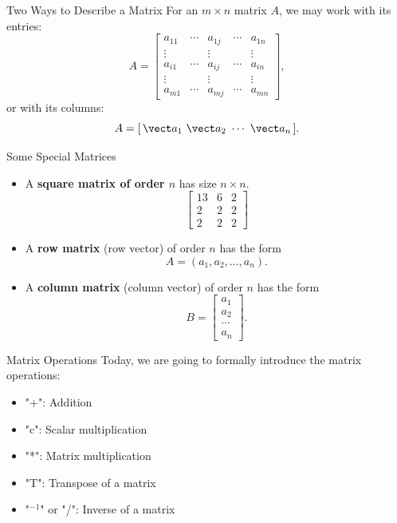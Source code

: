 \begin{frame}{Two Ways to Describe a Matrix}
For an $m\times n$ matrix $A$, we may work with its entries:
\[
A=\begin{bmatrix}
a_{11}&\cdots&a_{1j}&\cdots&a_{1n}\\
\vdots&&\vdots&&\vdots\\
a_{i1}&\cdots&a_{ij}&\cdots&a_{in}\\
\vdots&&\vdots&&\vdots\\
a_{m1}&\cdots&a_{mj}&\cdots&a_{mn}
\end{bmatrix},
\]
or with its columns:
\[
A=[\,\vect a_1\ \vect a_2\ \cdots\ \vect a_n\,].
\]
\end{frame}

\begin{frame}{Some Special Matrices}
\begin{itemize}
  \item A \textbf{square matrix of order $n$} has size $n\times n$.
  \[
  \begin{bmatrix}13&6&2\\2&2&2\\2&2&2\end{bmatrix}
  \]
  \item A \textbf{row matrix} (row vector) of order $n$ has the form
  \[A=(a_1,a_2,\ldots,a_n).\]
  \item A \textbf{column matrix} (column vector) of order $n$ has the form
  \[B=\begin{bmatrix}a_1\\a_2\\\cdots\\a_n\end{bmatrix}.\]
\end{itemize}
\end{frame}

\begin{frame}{Matrix Operations}
  Today, we are going to formally introduce the matrix operations:
\begin{itemize}
  \item \textcolor{lecturemagenta}{"+": Addition}
  \item \textcolor{lecturemagenta}{"c": Scalar multiplication}
  \item \textcolor{lecturemagenta}{"*": Matrix multiplication}
  \item \textcolor{lecturemagenta}{"T": Transpose of a matrix}
  \item \textcolor{lecturemagenta}{"$^{-1}$" or "/": Inverse of a matrix}
\end{itemize}
\end{frame}

